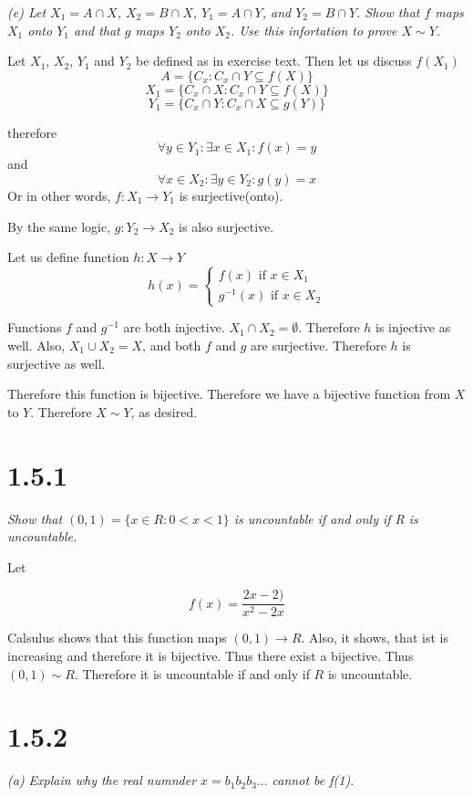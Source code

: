 \documentclass[11pt,oneside,titlepage]{article}
\begin{document}
\textit{(e) Let $X_1 = A \cap X$, $X_2 = B \cap X$, $Y_1 = A \cap Y$, and $Y_2 = B \cap Y$.
  Show that $f$ maps $X_1$ onto $Y_1$ and that $g$ maps $Y_2$ onto $X_2$. Use this
  infortation to prove $X \sim Y$.}

Let $X_1$, $X_2$, $Y_1$ and $Y_2$ be defined as in exercise text. Then
let us discuss $f(X_1)$
$$A = \{C_x: C_x \cap Y \subseteq f(X)\}$$
$$X_1 = \{C_x \cap X: C_x \cap Y \subseteq f(X)\}$$
$$Y_1 = \{C_x \cap Y: C_x \cap X \subseteq g(Y)\}$$

therefore
$$\forall y \in Y_1: \exists x \in X_1: f(x) = y$$
and
$$\forall x \in X_2: \exists y \in Y_2: g(y) = x$$
Or in other words, $f: X_1 \to Y_1$ is surjective(onto).

By the same logic, $g: Y_2 \to X_2$ is also surjective.

Let us define function $h: X \to Y$
\begin {equation}
h(x) =
  \begin{cases}
    f(x) \text{ if } x \in X_1 \\
    g^{-1}(x) \text{ if } x \in X_2
  \end{cases}
\end {equation}

Functions $f$ and $g^{-1}$ are both injective.  $X_1 \cap X_2 = \emptyset$. Therefore
$h$ is injective as well.
Also, $X_1 \cup X_2 = X$,  and both $f$ and $g$ are surjective. Therefore $h$ is surjective
as well.

Therefore this function is bijective. Therefore we have a bijective function from
$X$ to $Y$. Therefore $X \sim Y$, as desired.
    
\section*{1.5.1}
\textit{Show that $(0, 1) = \{x \in R: 0 < x < 1\}$ is uncountable if and only if R
  is uncountable.}

Let

$$ f(x) = \frac{2x - 2)}{x ^ 2 - 2x}$$

Calsulus shows that this function maps $(0, 1) \to R$. Also, it shows,
that ist is increasing and therefore it is bijective. Thus
there exist a bijective. Thus $(0, 1) \sim R$. Therefore it is uncountable
if and only if $R$ is uncountable.

\section*{1.5.2}
\textit{(a) Explain why the real numnder $x = b_1 b_2 b_3...$ cannot be f(1).}
\end{document}

